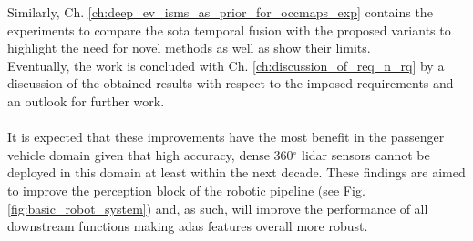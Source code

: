 Similarly, Ch. \ref{ch:deep_ev_isms_as_prior_for_occmaps_exp} contains the experiments to compare the \gls{sota} temporal fusion with the proposed variants to highlight the need for novel methods as well as show their limits.\\
Eventually, the work is concluded with Ch. \ref{ch:discussion_of_req_n_rq} by a discussion of the obtained results with respect to the imposed requirements and an outlook for further work.
\\\\
It is expected that these improvements have the most benefit in the passenger vehicle domain given that high accuracy, dense 360$^{\circ}$ lidar sensors cannot be deployed in this domain at least within the next decade. These findings are aimed to improve the perception block of the robotic pipeline (see Fig. \ref{fig:basic_robot_system}) and, as such, will improve the performance of all downstream functions making \gls{adas} features overall more robust.